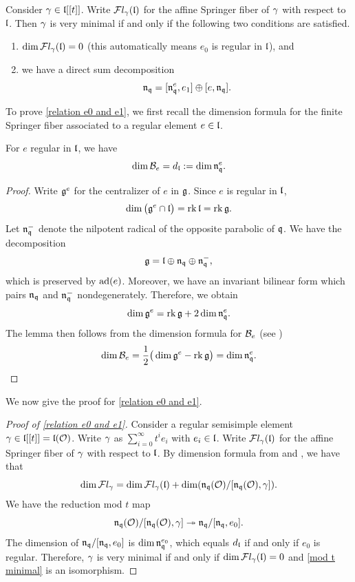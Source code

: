 \documentclass[11pt]{article}
\numberwithin{equation}{section}
\begin{document}
\begin{appendix}
\begin{pro}\label{relation e0 and e1}
    Consider $\gamma\in \mathfrak{l}[[t]]$. Write $\mathcal{F}l_\gamma(\mathfrak{l})$ for the affine Springer fiber of $\gamma$ with respect to $\mathfrak{l}$. Then $\gamma$ is very minimal if and only if the following two conditions are satisfied.
    \begin{enumerate}
        \item $\dim \mathcal{F}l_\gamma(\mathfrak{l})=0$ (this automatically means $e_0$ is regular in $\mathfrak{l}$), and 
        \item we have a direct sum decomposition
    $$\mathfrak{n}_{\mathfrak{q}}= [\mathfrak{n}_{\mathfrak{q}}^{e},e_1]\oplus [e,\mathfrak{n}_{\mathfrak{q}}].$$
    \end{enumerate}
    
\end{pro}

To prove \cref{relation e0 and e1}, we first recall the dimension formula for the finite Springer fiber associated to a regular element $e\in \mathfrak{l}$. 

\begin{lem}\label{dimension of finite spr}
    For $e$ regular in $\mathfrak{l}$, we have
\[
\dim \mathcal{B}_{e}
= d_{\mathfrak{l}}:=\dim \mathfrak{n}_{\mathfrak{q}}^{e}.
\]
\end{lem}
\begin{proof}
Write $\mathfrak{g}^{e}$ for the centralizer of $e$ in $\mathfrak{g}$. Since $e$ is regular in $\mathfrak{l}$, 
\[
\dim\big(\mathfrak{g}^e\cap \mathfrak{l}\big)=\operatorname{rk} \mathfrak{l}=\operatorname{rk} \mathfrak{g}.
\]
Let $\mathfrak{n}_{\mathfrak{q}}^{-}$ denote the nilpotent radical of the opposite parabolic of $\mathfrak{q}$. We have the decomposition 
\[
\mathfrak{g}=\mathfrak{l}\oplus \mathfrak{n}_{\mathfrak{q}}\oplus \mathfrak{n}_{\mathfrak{q}}^{-},
\]
which is preserved by $\operatorname{ad}(e)$. Moreover, we have an invariant bilinear form which pairs 
$\mathfrak{n}_{\mathfrak{q}}$ and $\mathfrak{n}_{\mathfrak{q}}^{-}$ nondegenerately. Therefore, we obtain
$$\dim \mathfrak{g}^{e} = \operatorname{rk} \mathfrak{g} +2\dim\mathfrak{n}_{\mathfrak{q}}^{e}.$$
The lemma then follows from the dimension formula for $\mathcal{B}_{e}$ (see \cite[Section 3]{CG}) 
\[
\dim \mathcal{B}_{e}
=
\frac{1}{2}\big(\dim \mathfrak{g}^e - \operatorname{rk} \mathfrak{g}\big)= \dim \mathfrak{n}_{\mathfrak{q}}^{e}.
\]
\end{proof}
We now give the proof for \cref{relation e0 and e1}.
\begin{proof}[Proof of \cref{relation e0 and e1}]
    Consider a regular semisimple element $\gamma\in \mathfrak{l}[[t]]= \mathfrak{l}(\mathcal{O})$. Write $\gamma$ as $\sum_{i=0}^\infty t^ie_i$ with $e_i\in \mathfrak{l}$. Write $\mathcal{F}l_\gamma(\mathfrak{l})$ for the affine Springer fiber of $\gamma$ with respect to $\mathfrak{l}$. By dimension formula from \cite[Section 5]{KL88} and \cite{dimensionASF}, we have that
    $$\dim \mathcal{F}l_\gamma= \dim \mathcal{F}l_\gamma(\mathfrak{l})+ \dim (\mathfrak{n}_{\mathfrak{q}}(\mathcal{O})/[\mathfrak{n}_{\mathfrak{q}}(\mathcal{O}),\gamma]).$$
    We have the reduction mod $t$ map
\begin{equation}\label{mod t minimal}
    \mathfrak{n}_{\mathfrak{q}}(\mathcal{O})/[\mathfrak{n}_{\mathfrak{q}}(\mathcal{O}),\gamma]\twoheadrightarrow \mathfrak{n}_{\mathfrak{q}}/[\mathfrak{n}_{\mathfrak{q}},e_0].
\end{equation}
The dimension of $\mathfrak{n}_{\mathfrak{q}}/[\mathfrak{n}_{\mathfrak{q}},e_0]$ is $\dim \mathfrak{n}_{\mathfrak{q}}^{e_0}$, which equals $d_{\mathfrak{l}}$ if and only if $e_0$ is regular. Therefore, $\gamma$ is very minimal if and only if $\dim \mathcal{F}l_\gamma(\mathfrak{l})=0$ and \eqref{mod t minimal} is an isomorphism. 


\end{proof}
\end{appendix}
\end{document}
